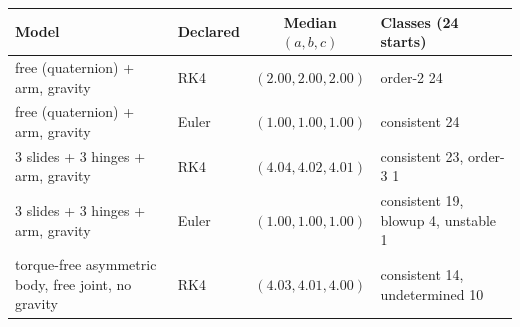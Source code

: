 \begin{tabular}{llcl}
\toprule
Model & Declared & Median $(a,b,c)$ & Classes (24 starts) \\
\midrule
free (quaternion) + arm, gravity & RK4 & $(2.00,2.00,2.00)$ & order-2 24 \\
free (quaternion) + arm, gravity & Euler & $(1.00,1.00,1.00)$ & consistent 24 \\
3 slides + 3 hinges + arm, gravity & RK4 & $(4.04,4.02,4.01)$ & consistent 23, order-3 1 \\
3 slides + 3 hinges + arm, gravity & Euler & $(1.00,1.00,1.00)$ & consistent 19, blowup 4, unstable 1 \\
torque-free asymmetric body, free joint, no gravity & RK4 & $(4.03,4.01,4.00)$ & consistent 14, undetermined 10 \\
\bottomrule
\end{tabular}
